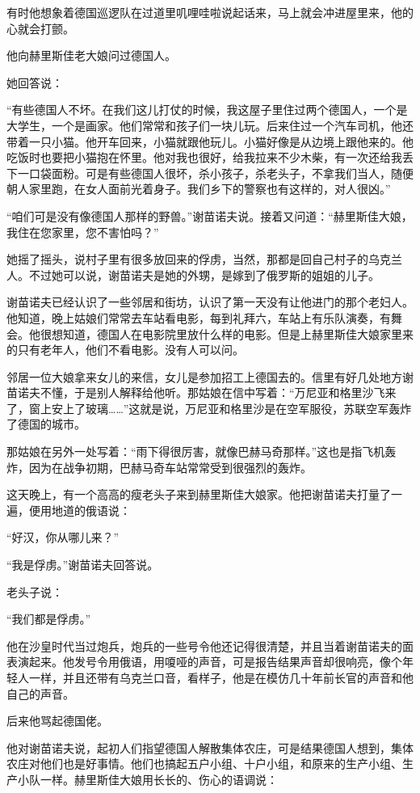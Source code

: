 有时他想象着德国巡逻队在过道里叽哩哇啦说起话来，马上就会冲进屋里来，他的心就会打颤。

他向赫里斯佳老大娘问过德国人。

她回答说：

“有些德国人不坏。在我们这儿打仗的时候，我这屋子里住过两个德国人，一个是大学生，一个是画家。他们常常和孩子们一块儿玩。后来住过一个汽车司机，他还带着一只小猫。他开车回来，小猫就跟他玩儿。小猫好像是从边境上跟他来的。他吃饭时也要把小猫抱在怀里。他对我也很好，给我拉来不少木柴，有一次还给我丢下一口袋面粉。可是有些德国人很坏，杀小孩子，杀老头子，不拿我们当人，随便朝人家里跑，在女人面前光着身子。我们乡下的警察也有这样的，对人很凶。”

“咱们可是没有像德国人那样的野兽。”谢苗诺夫说。接着又问道：“赫里斯佳大娘，我住在您家里，您不害怕吗？”

她摇了摇头，说村子里有很多放回来的俘虏，当然，那都是回自己村子的乌克兰人。不过她可以说，谢苗诺夫是她的外甥，是嫁到了俄罗斯的姐姐的儿子。

谢苗诺夫已经认识了一些邻居和街坊，认识了第一天没有让他进门的那个老妇人。他知道，晚上姑娘们常常去车站看电影，每到礼拜六，车站上有乐队演奏，有舞会。他很想知道，德国人在电影院里放什么样的电影。但是上赫里斯佳大娘家里来的只有老年人，他们不看电影。没有人可以问。

邻居一位大娘拿来女儿的来信，女儿是参加招工上德国去的。信里有好几处地方谢苗诺夫不懂，于是别人解释给他听。那姑娘在信中写着：“万尼亚和格里沙飞来了，窗上安上了玻璃……”这就是说，万尼亚和格里沙是在空军服役，苏联空军轰炸了德国的城市。

那姑娘在另外一处写着：“雨下得很厉害，就像巴赫马奇那样。”这也是指飞机轰炸，因为在战争初期，巴赫马奇车站常常受到很强烈的轰炸。

这天晚上，有一个高高的瘦老头子来到赫里斯佳大娘家。他把谢苗诺夫打量了一遍，便用地道的俄语说：

“好汉，你从哪儿来？”

“我是俘虏。”谢苗诺夫回答说。

老头子说：

“我们都是俘虏。”

他在沙皇时代当过炮兵，炮兵的一些号令他还记得很清楚，并且当着谢苗诺夫的面表演起来。他发号令用俄语，用嗄哑的声音，可是报告结果声音却很响亮，像个年轻人一样，并且还带有乌克兰口音，看样子，他是在模仿几十年前长官的声音和他自己的声音。

后来他骂起德国佬。

他对谢苗诺夫说，起初人们指望德国人解散集体农庄，可是结果德国人想到，集体农庄对他们也是好事情。他们也搞起五户小组、十户小组，和原来的生产小组、生产小队一样。赫里斯佳大娘用长长的、伤心的语调说：

